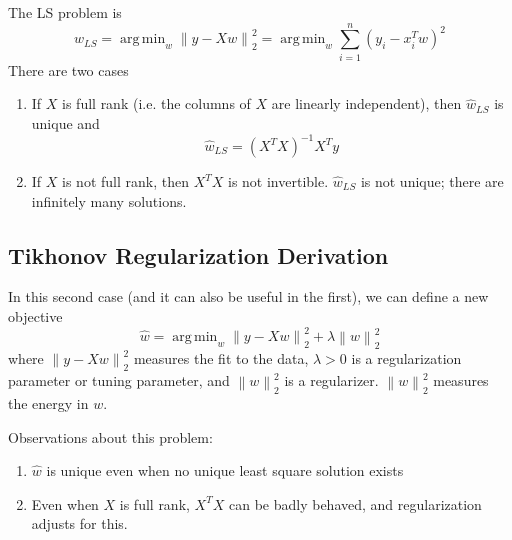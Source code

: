 \documentclass[12pt]{article}
\theoremstyle{definition}
\DeclareMathOperator*{\argmin}{arg\,min}
\newcommand{\norm}[1]{\left\lVert#1\right\rVert}
\begin{document}
The LS problem is
\begin{equation}
	\hat w_{LS} = \argmin_w \norm{y - Xw}^2_2  = \argmin_w \sum_{i=1}^n (y_i - x^T_i w)^2
\end{equation}
There are two cases
\begin{enumerate}
	\item If $X$ is full rank (i.e. the columns of $X$ are linearly independent), then $\hat w_{LS}$ is unique and 
	\begin{equation}
		\hat w_{LS} = (X^T X)^{-1} X^T y
	\end{equation}
	\item If $X$ is not full rank, then $X^T X$ is not invertible. $\hat w_{LS}$ is not unique; there are infinitely many solutions. 
\end{enumerate}

\subsection{Tikhonov Regularization Derivation}
In this second case (and it can also be useful in the first), we can define a new objective
\begin{equation}
	\hat w = \argmin_w \norm{y - Xw}^2_2 + \lambda \norm{w}^2_2
\end{equation}
where $\norm{y - Xw}^2_2$ measures the fit to the data, $\lambda > 0$ is a regularization parameter or tuning parameter, and $\norm{w}^2_2$ is a regularizer. $\norm{w}^2_2$ measures the energy in $w$. 

Observations about this problem:
\begin{enumerate}
	\item $\hat w$ is unique even when no unique least square solution exists
	\item Even when $X$ is full rank, $X^T X$ can be badly behaved, and regularization adjusts for this. 
\end{enumerate}
\end{document}
